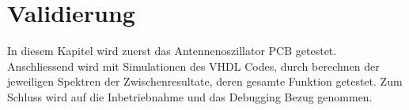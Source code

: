 \clearpage
\section{Validierung}\label{sec:Validierung}
In diesem Kapitel wird zuerst das Antennenoszillator PCB getestet. Anschliessend wird mit Simulationen des VHDL Codes, durch berechnen der jeweiligen Spektren der Zwischenresultate, deren gesamte Funktion getestet. Zum Schluss wird auf die Inbetriebnahme und das Debugging Bezug genommen.